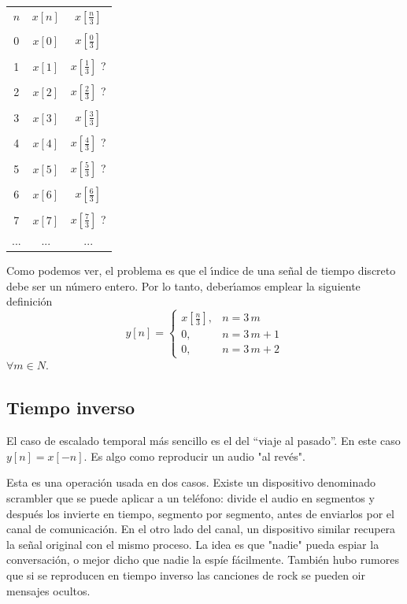 \begin{enumerate}
\begin{tabular}{ccc}
$n$ & $x[n]$  & $x[\frac{n}{3}]$ \\
& & \\
0   &  $x[0]$ & $x[\frac{0}{3}]$ \\
& & \\
1   &  $x[1]$ & $x[\frac{1}{3}]$ ?\\
& & \\
2   &  $x[2]$ & $x[\frac{2}{3}]$ ?\\
& & \\
3   &  $x[3]$ & $x[\frac{3}{3}]$ \\
& & \\
4   &  $x[4]$ & $x[\frac{4}{3}]$ ?\\
& & \\
5   &  $x[5]$ & $x[\frac{5}{3}]$ ?\\
& & \\
6   &  $x[6]$ & $x[\frac{6}{3}]$ \\
& & \\
7   &  $x[7]$ & $x[\frac{7}{3}]$ ?\\
... &  ... & ...
\end{tabular}

Como podemos ver, el problema es que el \'{\i}ndice de una se\~{n}al
de tiempo discreto debe ser un n\'{u}mero entero. Por lo tanto,
deber\'{\i}amos emplear la siguiente definici\'{o}n
\begin{equation}
y[n] = \left\{ \begin{array}{cc}
    x[\frac{n}{3}],      & n = 3 \, m \\
    0,         & n = 3 \, m + 1\\
    0,         & n = 3 \, m + 2
\end{array} \right.
\end{equation}
$\forall m \in N$.

\end{enumerate}

\subsection{Tiempo inverso}

El caso de escalado temporal m\'{a}s sencillo es el del ``viaje al
pasado''. En este caso $y[n] = x[-n]$. Es algo como reproducir un audio "al revés".

Esta es una operación usada en dos casos. Existe un dispositivo denominado scrambler que se puede aplicar a un teléfono: divide el audio en segmentos y después los invierte en tiempo, segmento por segmento, antes de enviarlos por el canal de comunicación. En el otro lado del canal, un dispositivo similar recupera la señal original con el mismo proceso. La idea es que "nadie" pueda espiar la conversación, o mejor dicho que nadie la espíe fácilmente.
También hubo rumores que si se reproducen en tiempo inverso las canciones de rock se pueden oir mensajes ocultos.

